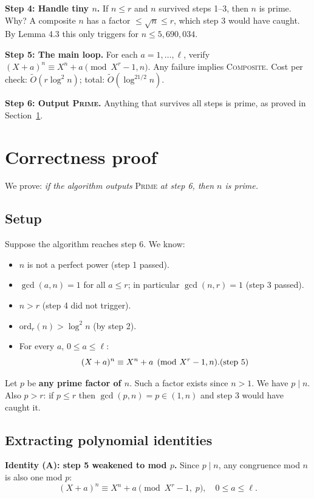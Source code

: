 \documentclass[12pt]{article}
\newcommand{\ord}{\mathrm{ord}}
\newcommand{\OO}{\widetilde{O}}
\begin{document}
\textbf{Step 4: Handle tiny $n$.}
If $n\leq r$ and $n$ survived steps 1--3, then $n$ is prime. Why? A composite $n$ has a factor $\leq\sqrt{n}\leq r$, which step 3 would have caught. By Lemma 4.3 this only triggers for $n\leq 5{,}690{,}034$.

\textbf{Step 5: The main loop.}
For each $a=1,\ldots,\ell$, verify $(X+a)^n\equiv X^n+a\pmod{X^r-1,n}$. Any failure implies \textsc{Composite}. Cost per check: $\OO(r\log^2 n)$; total: $\OO(\log^{21/2}n)$.

\textbf{Step 6: Output \textsc{Prime}.}
Anything that survives all steps is prime, as proved in Section~\ref{sec:correctness}.

\section{Correctness proof}
\label{sec:correctness}

We prove: \emph{if the algorithm outputs} \textsc{Prime} \emph{at step 6, then $n$ is prime.}

\subsection{Setup}

Suppose the algorithm reaches step 6. We know:
\begin{itemize}[itemsep=2pt]
  \item $n$ is not a perfect power (step 1 passed).
  \item $\gcd(a,n)=1$ for all $a\leq r$; in particular $\gcd(n,r)=1$ (step 3 passed).
  \item $n > r$ (step 4 did not trigger).
  \item $\ord_r(n)>\log^2 n$ (by step 2).
  \item For every $a$, $0\leq a\leq\ell$:
  \[
    (X+a)^n \equiv X^n+a \pmod{X^r-1, n}. \hfill\text{(step 5)}
  \]
\end{itemize}

Let $p$ be \textbf{any prime factor of $n$}. Such a factor exists since $n>1$. We have $p\mid n$. Also $p>r$: if $p\leq r$ then $\gcd(p,n)=p\in(1,n)$ and step 3 would have caught it.

\subsection{Extracting polynomial identities}

\textbf{Identity (A): step 5 weakened to mod $p$.} Since $p\mid n$, any congruence mod $n$ is also one mod $p$:
\begin{equation}
  (X+a)^n \equiv X^n+a \pmod{X^r-1,\; p}, \quad 0\leq a\leq\ell. \tag{A}
\end{equation}
\end{document}
